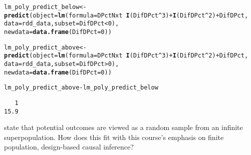 \documentclass[11pt,leqno]{article}\usepackage[]{graphicx}\usepackage[]{color}
\makeatletter
\newcommand{\hlnum}[1]{\textcolor[rgb]{0.686,0.059,0.569}{#1}}%
\newcommand{\hlopt}[1]{\textcolor[rgb]{0,0,0}{#1}}%
\newcommand{\hlstd}[1]{\textcolor[rgb]{0.345,0.345,0.345}{#1}}%
\newcommand{\hlkwb}[1]{\textcolor[rgb]{0.69,0.353,0.396}{#1}}%
\newcommand{\hlkwc}[1]{\textcolor[rgb]{0.333,0.667,0.333}{#1}}%
\newcommand{\hlkwd}[1]{\textcolor[rgb]{0.737,0.353,0.396}{\textbf{#1}}}%
\newenvironment{kframe}{%
 \def\at@end@of@kframe{}%
 \ifinner\ifhmode%
  \def\at@end@of@kframe{\end{minipage}}%
  \begin{minipage}{\columnwidth}%
 \fi\fi%
 \def\FrameCommand##1{\hskip\@totalleftmargin \hskip-\fboxsep
 \colorbox{shadecolor}{##1}\hskip-\fboxsep
     \hskip-\linewidth \hskip-\@totalleftmargin \hskip\columnwidth}%
 \MakeFramed {\advance\hsize-\width
   \@totalleftmargin\z@ \linewidth\hsize
   \@setminipage}}%
 {\par\unskip\endMakeFramed%
 \at@end@of@kframe}
\newenvironment{knitrout}{}{} %
\theoremstyle{newstyle}
\makeatother
\begin{document}
\begin{knitrout}\footnotesize
{}\color{fgcolor}\begin{kframe}
\begin{alltt}
\hlstd{lm_poly_predict_below} \hlkwb{<-} \hlkwd{predict}\hlstd{(}\hlkwc{object} \hlstd{=} \hlkwd{lm}\hlstd{(}\hlkwc{formula} \hlstd{= DPctNxt} \hlopt{~} \hlkwd{I}\hlstd{(DifDPct}\hlopt{^}\hlnum{3}\hlstd{)} \hlopt{+} \hlkwd{I}\hlstd{(DifDPct}\hlopt{^}\hlnum{2}\hlstd{)} \hlopt{+} \hlstd{DifDPct,}
                                             \hlkwc{data} \hlstd{= rdd_data,} \hlkwc{subset} \hlstd{= DifDPct} \hlopt{<} \hlnum{0}\hlstd{),}
                                 \hlkwc{newdata} \hlstd{=} \hlkwd{data.frame}\hlstd{(}\hlkwc{DifDPct} \hlstd{=} \hlnum{0}\hlstd{))}

\hlstd{lm_poly_predict_above} \hlkwb{<-} \hlkwd{predict}\hlstd{(}\hlkwc{object} \hlstd{=} \hlkwd{lm}\hlstd{(}\hlkwc{formula} \hlstd{= DPctNxt} \hlopt{~} \hlkwd{I}\hlstd{(DifDPct}\hlopt{^}\hlnum{3}\hlstd{)} \hlopt{+} \hlkwd{I}\hlstd{(DifDPct}\hlopt{^}\hlnum{2}\hlstd{)} \hlopt{+} \hlstd{DifDPct,}
                                             \hlkwc{data} \hlstd{= rdd_data,} \hlkwc{subset} \hlstd{= DifDPct} \hlopt{>} \hlnum{0}\hlstd{),}
                                 \hlkwc{newdata} \hlstd{=} \hlkwd{data.frame}\hlstd{(}\hlkwc{DifDPct} \hlstd{=} \hlnum{0}\hlstd{))}

\hlstd{lm_poly_predict_above} \hlopt{-} \hlstd{lm_poly_predict_below}
\end{alltt}
\begin{verbatim}
   1 
15.9 
\end{verbatim}
\end{kframe}
\end{knitrout}

\citet[647]{cattaneotitiunikvazquez-bare2017} state that potential outcomes are viewed as a random sample from an infinite superpopulation. How does this fit with this course's emphasis on finite population, design-based causal inference?

\newpage


\begin{singlespace}
\end{singlespace}

\newpage
\end{document}
